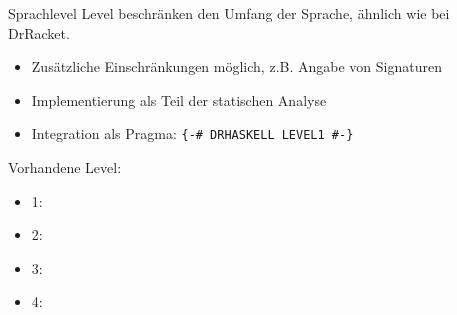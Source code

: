 \begin{frame}{Sprachlevel}
	Level beschränken den Umfang der Sprache, ähnlich wie bei DrRacket.
	\begin{itemize}
		\item Zusätzliche Einschränkungen  möglich, z.B. Angabe von Signaturen
		\item Implementierung als Teil der statischen Analyse
		\item Integration als Pragma: \texttt{\{-\# DRHASKELL LEVEL1 \#-\}}
	\end{itemize}
	Vorhandene Level:
	\begin{itemize}
		\item 1:
		\item 2:
		\item 3:
		\item 4:
	\end{itemize}
\end{frame}